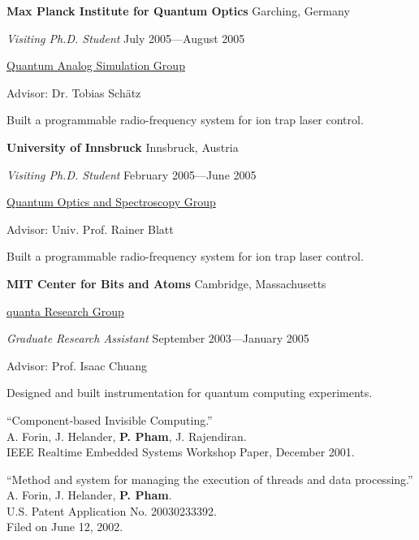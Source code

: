 \documentclass[letter]{article}
\begin{document}
\vspace{\baselineskip}
\par
{\bf Max Planck Institute for Quantum Optics} \hfill Garching, Germany
\par
{\em Visiting Ph.D. Student} \hfill July 2005---August 2005
\par
\href{http://www.mpq.mpg.de/qsim/}{Quantum Analog Simulation Group}
\par
Advisor: Dr. Tobias Sch\"atz
\par
Built a programmable radio-frequency system for ion trap laser control.
\par

\vspace{\baselineskip}
\par
{\bf University of Innsbruck} \hfill Innsbruck, Austria
\par
{\em Visiting Ph.D. Student} \hfill February 2005---June 2005
\par
\href{http://heart-c704.uibk.ac.at/index.html}{Quantum Optics and Spectroscopy Group}
\par
Advisor: Univ. Prof. Rainer Blatt
\par
Built a programmable radio-frequency system for ion trap laser control.
\par

\vspace{\baselineskip}
\par
{\bf MIT Center for Bits and Atoms} \hfill Cambridge, Massachusetts
\par
\href{http://web.mit.edu/~cua/www/quanta/}{quanta Research Group}
\par
{\em Graduate Research Assistant} \hfill September 2003---January 2005
\par
Advisor: Prof. Isaac Chuang
\par
Designed and built instrumentation for quantum computing experiments.
\par

\vspace{\baselineskip}
\par
``Component-based Invisible Computing.''
\\
A. Forin, J. Helander, \textbf{P. Pham}, J. Rajendiran.\\
IEEE Realtime Embedded Systems Workshop Paper, December 2001.

\newpage

``Method and system for managing the execution of threads and data processing.''
\\
A. Forin, J. Helander, \textbf{P. Pham}.\\
U.S. Patent Application No. 20030233392.\\
Filed on June 12, 2002.
\end{document}
